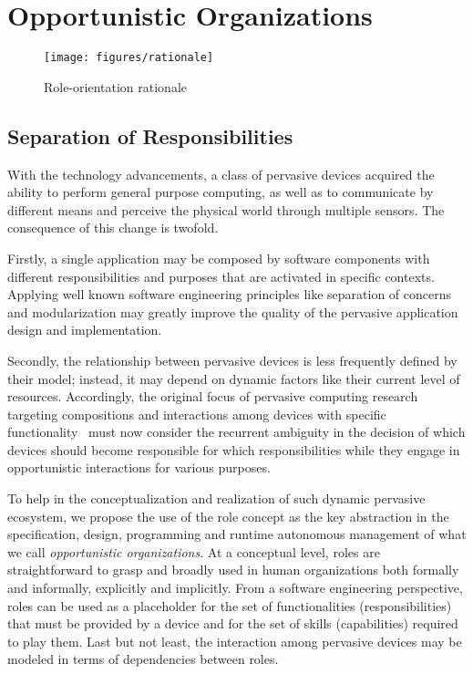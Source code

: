 \section{Opportunistic Organizations}\label{sec:edge_spaces}

\begin{figure*}[t!]
	\centering
	\texttt{[image: figures/rationale]}
	\caption{Role-orientation rationale}
	\label{fig:rationale}
\end{figure*}

\subsection{Separation of Responsibilities}

With the technology advancements, a class of pervasive devices acquired the ability to perform general purpose computing, as well as to communicate by different means and perceive the physical world through multiple sensors. The consequence of this change is twofold. 

Firstly, a single application may be composed by software components with different responsibilities and purposes that are activated in specific contexts. Applying well known software engineering principles like separation of concerns and modularization may greatly improve the quality of the pervasive application design and implementation.

Secondly, the relationship between pervasive devices is less frequently defined by their model; instead, it may depend on dynamic factors like their current level of resources. Accordingly, the original focus of pervasive computing research targeting compositions and interactions among devices with specific functionality~\cite{} must now consider the recurrent ambiguity in the decision of which devices should become responsible for which responsibilities while they engage in opportunistic interactions for various purposes. 


To help in the conceptualization and realization of such dynamic pervasive ecosystem, we propose the use of the role concept as the key abstraction in the specification, design, programming and runtime autonomous management of what we call \textit{opportunistic organizations}. At a conceptual level, roles are straightforward to grasp and broadly used in human organizations both formally and informally, explicitly and implicitly. From a software engineering perspective, roles can be used as a placeholder for the set of functionalities (responsibilities) that must be provided by a device and for the set of skills (capabilities) required to play them. Last but not least, the interaction among pervasive devices may be modeled in terms of dependencies between roles.


